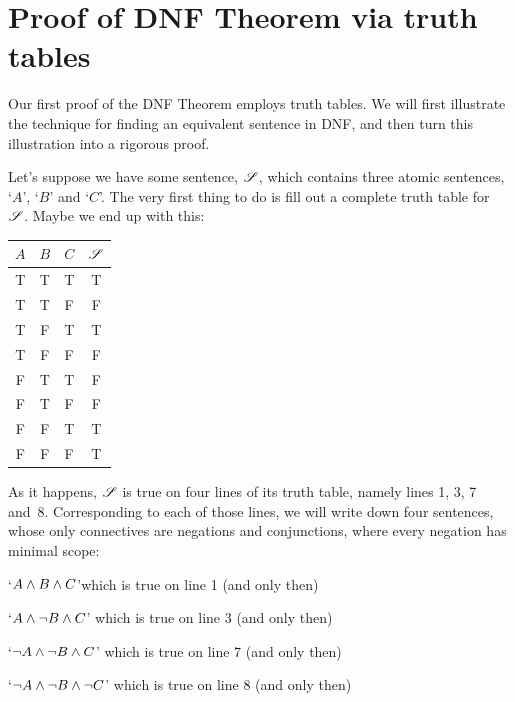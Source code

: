 \section{Proof of DNF Theorem via truth tables}
\label{s:DNFTruthTable}

Our first proof of the DNF Theorem employs truth tables. We will first illustrate the technique for finding an equivalent sentence in DNF, and then turn this illustration into a rigorous proof.

Let's suppose we have some sentence, $\mathscr{S}$, which contains three atomic sentences, `$A$', `$B$' and `$C$'. The very first thing to do is fill out a complete truth table for~$\mathscr{S}$. Maybe we end up with this:
\begin{center}
\begin{tabular}{c c c | c}
$A$ & $B$ & $C$ & $\mathscr{S}$\\
\hline
 T & T & T & T \\
 T & T & F & F \\
 T & F & T & T \\
 T & F & F & F \\
 F & T & T & F \\
 F & T & F & F \\
 F & F & T & T \\
 F & F & F & T
\end{tabular}
\end{center}
%
%
As it happens, $\mathscr{S}$ is true on four lines of its truth table, namely lines 1, 3, 7 and~8. Corresponding to each of those lines, we will write down four sentences, whose only connectives are negations and conjunctions, where every negation has minimal scope:
	\begin{compactlist}
		\item  `$A \wedge B \wedge C$'\hfill which is true on line 1 (and only then)
		\item `$A \wedge \neg B \wedge C$' \hfill which is true on line 3 (and only then)
		\item `$\neg A \wedge \neg B \wedge C$' \hfill which is true on line 7 (and only then)
		\item `$\neg A \wedge \neg B \wedge \neg C$' \hfill which is true on line 8 (and only then)
	\end{compactlist}
